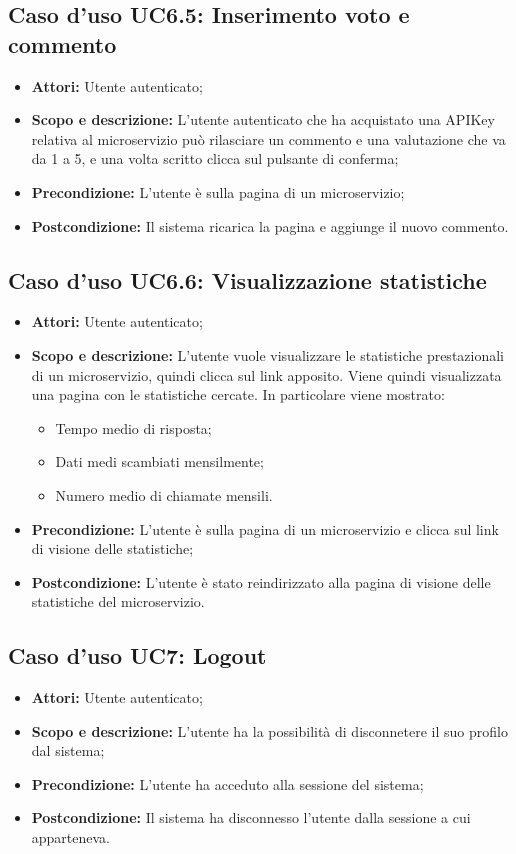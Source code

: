 \documentclass[12pt,a4paper,titlepage]{article}
\begin{document}
	\subsection{Caso d'uso UC6.5: Inserimento voto e commento}
	\label{UC6.5}
	\begin{itemize}
		\item \textbf{Attori: }Utente autenticato;
		\item \textbf{Scopo e descrizione: }L'utente autenticato che ha acquistato una APIKey relativa al microservizio può rilasciare un commento e una valutazione che va da 1 a 5, e una volta scritto clicca sul pulsante di conferma;
		\item \textbf{Precondizione: }L'utente è sulla pagina di un microservizio;
		\item \textbf{Postcondizione: }Il sistema ricarica la pagina e aggiunge il nuovo commento.
	\end{itemize}
	\subsection{Caso d'uso UC6.6: Visualizzazione statistiche }
	\label{UC6.6}
	\begin{itemize}
		\item \textbf{Attori: }Utente autenticato;
		\item \textbf{Scopo e descrizione: }L'utente vuole visualizzare le statistiche prestazionali di un microservizio, quindi clicca sul link apposito. Viene quindi visualizzata una pagina con le statistiche cercate. In particolare viene mostrato:
		\begin{itemize}
			\item Tempo medio di risposta;
			\item Dati medi scambiati mensilmente;
			\item Numero medio di chiamate mensili.
		\end{itemize}
		\item \textbf{Precondizione: }L'utente è sulla pagina di un microservizio e clicca sul link di visione delle statistiche;
		\item \textbf{Postcondizione: }L'utente è stato reindirizzato alla pagina di visione delle statistiche del microservizio.
	\end{itemize}
	\subsection{Caso d'uso UC7: Logout}
	\label{UC7}
	\begin{itemize}
		\item \textbf{Attori: }Utente autenticato;
		\item \textbf{Scopo e descrizione: }L'utente ha la possibilità di disconnetere il suo profilo dal sistema;
		\item \textbf{Precondizione: }L'utente ha acceduto alla sessione del sistema;
		\item \textbf{Postcondizione: }Il sistema ha disconnesso l'utente dalla sessione a cui apparteneva.
	\end{itemize}
\end{document}
